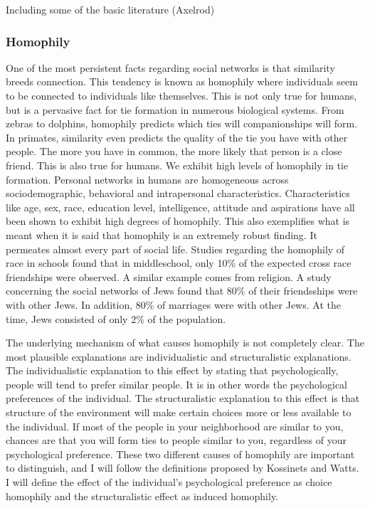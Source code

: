 \documentclass[9pt,twocolumn,twoside]{ilcss}
\begin{document}
Including some of the basic literature (Axelrod)

\subsubsection{Homophily}
One of the most persistent facts regarding social networks is that similarity breeds connection. 
This tendency is known as homophily where individuals seem to be connected to individuals like themselves. 
This is not only true for humans, but is a pervasive fact for tie formation in numerous biological systems. 
From zebras to dolphins, homophily predicts which ties will companionships will form. 
In primates, similarity even predicts the quality of the tie you have with other people. The more you have in common, the more likely that person is a close friend.
This is also true for humans. We exhibit high levels of homophily in tie formation. 
Personal networks in humans are homogeneous across sociodemographic, behavioral and intrapersonal characteristics. 
Characteristics like age, sex, race, education level, intelligence, attitude and aspirations have all been shown to exhibit high degrees of homophily. 
This also exemplifies what is meant when it is said that homophily is an extremely robust finding. It permeates almost every part of social life.
Studies regarding the homophily of race in schools found that in middleschool, only 10\% of the expected cross race friendships were observed. 
A similar example comes from religion. A study concerning the social networks of Jews found that 80\% of their friendsships were with other Jews. 
In addition, 80\% of marriages were with other Jews. At the time, Jews consisted of only 2\% of the population.

The underlying mechanism of what causes homophily is not completely clear. The most plausible explanations are individualistic and structuralistic explanations. 
The individualistic explanation to this effect by stating that psychologically, people will tend to prefer similar people. It is in other words the psychological preferences of the individual. 
The structuralistic explanation to this effect is that structure of the environment will make certain choices more or less available to the individual. 
If most of the people in your neighborhood are similar to you, chances are that you will form ties to people similar to you, regardless of your psychological preference. 
These two different causes of homophily are important to distinguish, and I will follow the definitions proposed by Kossinets and Watts. 
I will define the effect of the individual's psychological preference as choice homophily and the structuralistic effect as induced homophily. 
\end{document}
